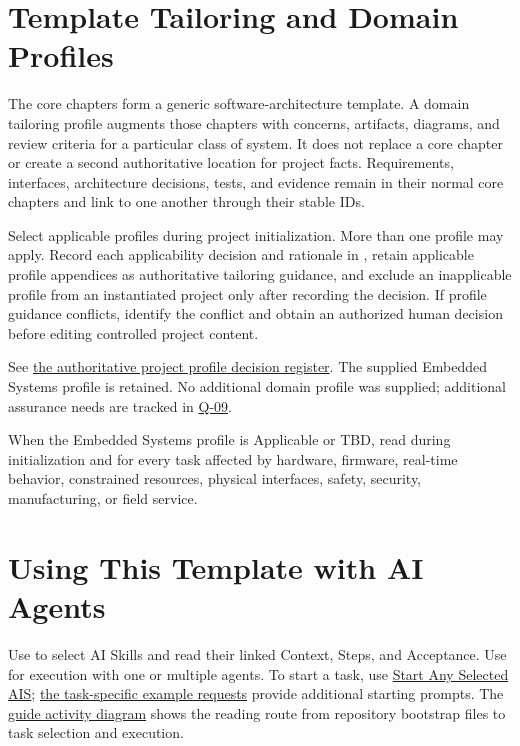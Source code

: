 \section{Template Tailoring and Domain Profiles}
\label{Section:DomainProfiles}
The core chapters form a generic software-architecture template. A domain
tailoring profile augments those chapters with concerns, artifacts, diagrams,
and review criteria for a particular class of system. It does not replace a
core chapter or create a second authoritative location for project facts.
Requirements, interfaces, architecture decisions, tests, and evidence remain
in their normal core chapters and link to one another through their stable IDs.

Select applicable profiles during project initialization. More than one
profile may apply. Record each applicability decision and rationale in
, retain applicable profile appendices as
authoritative tailoring guidance, and exclude an inapplicable profile from an
instantiated project only after recording the decision. If profile guidance
conflicts, identify the conflict and obtain an authorized human decision before
editing controlled project content.

\label{Table:DomainProfileApplicability}
See \hyperref[Table:ProjectDomainProfiles]{the authoritative project profile
decision register}. The supplied Embedded Systems profile is retained.
No additional domain profile was supplied; additional assurance needs are
tracked in \hyperref[Question:Q-09]{Q-09}.

When the Embedded Systems profile is Applicable or TBD, read
 during initialization and for every task
affected by hardware, firmware, real-time behavior, constrained resources,
physical interfaces, safety, security, manufacturing, or field service.

\section{Using This Template with AI Agents}
\label{Section:UsingTemplateAI}
Use  to select AI Skills and read their
linked Context, Steps, and Acceptance. Use
 for execution with one or multiple
agents. To start a task, use
\hyperref[Section:AIStartSelectedTaskPrompt]{Start Any Selected AIS};
\hyperref[Section:AIExamplePrompts]{the task-specific example requests}
provide additional starting prompts. The
\hyperref[Figure:AIGuideActivity]{guide activity diagram} shows the reading
route from repository bootstrap files to task selection and execution.

